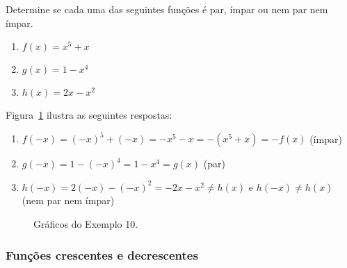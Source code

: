  Determine se cada uma das seguintes funções é par, ímpar ou nem par nem ímpar. 

\vspace{-0.35cm}
\begin{multicols}{3}
\vspace{-0.5cm}
  \begin{enumerate}[label=(\alph*)]
    \item $f(x) = x^5 + x$
    \item $g(x) = 1-x^4$
    \item $h(x) = 2x-x^2$
  \end{enumerate}

\end{multicols}  
\vspace{1cm}

\solution Figura~\ref{fig:ex10} ilustra as seguintes respostas:
\begin{enumerate}[label=(\alph*)]
  \item $f(-x)=(-x)^5 + (-x)= -x^5-x=-(x^5+x)=-f(x)$ (ímpar)
  \item $g(-x)=1-(-x)^4=1-x^4=g(x)$ (par)
  \item $h(-x)=2(-x)-(-x)^2=-2x-x^2\neq h(x)$ e $h(-x)\neq h(x)$ (nem par nem ímpar)
\end{enumerate}\vspace{-0.7cm}
\begin{figure}[!ht]
  \centering
  \caption{Gráficos do Exemplo 10.}
  \label{fig:ex10}
  \vspace{-0.7cm}
\end{figure}
\exampleEnd
  \vspace{-0.9cm}
\subsubsection{Funções crescentes e decrescentes}

